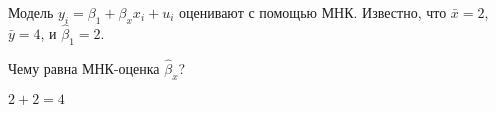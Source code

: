 
\begin{question}
Модель \(y_i = \beta_1 + \beta_x x_i + u_i\) оценивают с помощью МНК.
Известно, что \(\bar x= 2\), \(\bar y = 4\), и \(\hat \beta_1 = 2\).

Чему равна МНК-оценка \(\hat\beta_x\)?
\end{question}

\begin{solution}
\(2 + 2 = 4\)
\end{solution}

